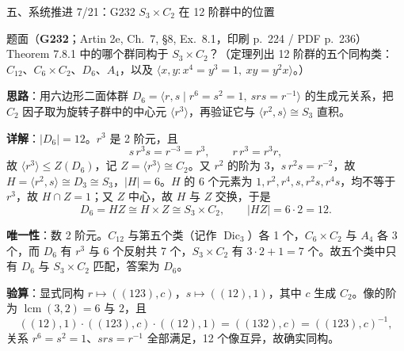 \documentclass[aspectratio=169,10pt,fontset=none]{ctexbeamer}
\newcommand{\ex}[1]{\textcolor{accent}{\footnotesize\bfseries #1}}
\newcommand{\key}[1]{\textcolor{ink}{\bfseries #1}}
\begin{document}
\begin{frame}[t]{五、系统推进 7/21：G232 $S_3\times C_2$ 在 12 阶群中的位置}
\label{ex:G232}
\scriptsize
\begin{block}{\footnotesize 题面（\ex{G232}；Artin 2e, Ch.~7, §8, Ex.~8.1，印刷 p.~224 / PDF p.~236）}
Theorem 7.8.1 中的哪个群同构于 $S_3\times C_2$？（定理列出 12 阶群的五个同构类：$C_{12}$、$C_6\times C_2$、$D_6$、$A_4$，以及 $\langle x,y:x^4=y^3=1,\ xy=y^2x\rangle$。）
\end{block}
\key{思路}：用六边形二面体群 $D_6=\langle r,s\mid r^6=s^2=1,\ srs=r^{-1}\rangle$ 的生成元关系，把 $C_2$ 因子取为旋转子群中的中心元 $\langle r^3\rangle$，再验证它与 $\langle r^2,s\rangle\cong S_3$ 直积。

\key{详解}：$|D_6|=12$。$r^3$ 是 2 阶元，且
\[ s\,r^3s=r^{-3}=r^3,\qquad r\,r^3=r^3r, \]
故 $\langle r^3\rangle\le Z(D_6)$，记 $Z=\langle r^3\rangle\cong C_2$。又 $r^2$ 的阶为 3，$s\,r^2s=r^{-2}$，故 $H=\langle r^2,s\rangle\cong D_3\cong S_3$，$|H|=6$。$H$ 的 6 个元素为 $1,r^2,r^4,s,r^2s,r^4s$，均不等于 $r^3$，故 $H\cap Z=1$；又 $Z$ 中心，故 $H$ 与 $Z$ 交换，于是
\[ D_6=HZ\cong H\times Z\cong S_3\times C_2,\qquad |HZ|=6\cdot2=12. \]

\key{唯一性}：数 2 阶元。$C_{12}$ 与第五个类（记作 $\operatorname{Dic}_3$）各 1 个，$C_6\times C_2$ 与 $A_4$ 各 3 个，而 $D_6$ 有 $r^3$ 与 6 个反射共 7 个，$S_3\times C_2$ 有 $3\cdot2+1=7$ 个。故五个类中只有 $D_6$ 与 $S_3\times C_2$ 匹配，答案为 $D_6$。

\key{验算}：显式同构 $r\mapsto((123),c)$，$s\mapsto((12),1)$，其中 $c$ 生成 $C_2$。像的阶为 $\operatorname{lcm}(3,2)=6$ 与 $2$，且
\[ ((12),1)\cdot((123),c)\cdot((12),1)=((132),c)=((123),c)^{-1}, \]
关系 $r^6=s^2=1$、$srs=r^{-1}$ 全部满足，12 个像互异，故确实同构。
\end{frame}

\end{document}
